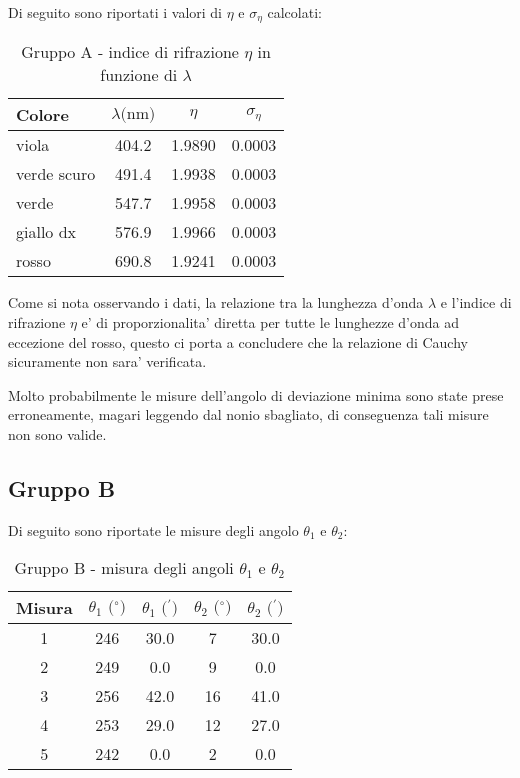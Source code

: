 Di seguito sono riportati i valori di $\eta$ e $\sigma_{\eta}$ calcolati:
\begin{table}[!htbp]
    {\par\centering
    \begin{tabular}{lccc}
        \hline
            Colore &
            $\lambda \text{(nm)}$ & 
            $\eta$ & 
            $\sigma_{\eta}$ \\
        \hline
        viola       &   404.2   &   1.9890 &   0.0003 \\
        verde scuro &   491.4   &   1.9938 &   0.0003 \\
        verde       &   547.7   &   1.9958 &   0.0003 \\
        giallo dx   &   576.9   &   1.9966 &   0.0003 \\
        rosso       &   690.8   &   1.9241 &   0.0003 \\
        \hline
    \end{tabular}
    \par}
    \caption{Gruppo A - indice di rifrazione $\eta$ in funzione di $\lambda$}
\end{table}

Come si nota osservando i dati, la relazione tra la lunghezza d'onda $\lambda$ e l'indice di rifrazione $\eta$ e' di proporzionalita' diretta per tutte le lunghezze d'onda ad eccezione del rosso, questo ci porta a concludere che la relazione di Cauchy sicuramente non sara' verificata.

Molto probabilmente le misure dell'angolo di deviazione minima sono state prese erroneamente, magari leggendo dal nonio sbagliato, di conseguenza tali misure non sono valide.

\subsection{Gruppo B}
Di seguito sono riportate le misure degli angolo $\theta_1$ e $\theta_2$:
\begin{table}[!htbp]
    {\par\centering
    \begin{tabular}{ccccc}
        \hline
            Misura & 
            $\theta_1 \text{ ($^{\circ}$)}$ &
            $\theta_1 \text{ ($^{\prime}$)}$ & 
            $\theta_2 \text{ ($^{\circ}$)}$ & 
            $\theta_2 \text{ ($^{\prime}$)}$ \\
        \hline
        1   &   246 &   30.0    &   7  &   30.0\\
        2   &   249 &   0.0     &   9  &   0.0\\
        3   &   256 &   42.0    &   16 &   41.0\\
        4   &   253 &   29.0    &   12 &   27.0\\
        5   &   242 &   0.0     &   2  &   0.0\\
        \hline
    \end{tabular}
    \par}
    \caption{Gruppo B - misura degli angoli $\theta_1$ e $\theta_2$}
\end{table}

